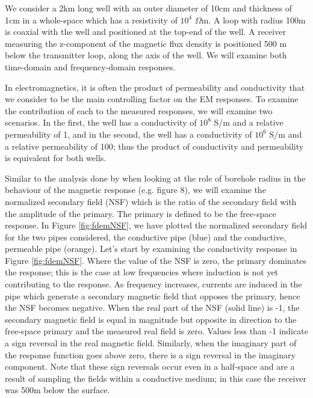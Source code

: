 We consider a 2km long well with an outer diameter of 10cm and thickness of 1cm in a whole-space which has a resistivity of $10^4$ $\Omega$m. A loop with radius 100m is coaxial with the well and positioned at the top-end of the well. A receiver measuring the z-component of the magnetic flux density is positioned 500 m below the transmitter loop, along the axis of the well. We will examine both time-domain and frequency-domain responses.

In electromagnetics, it is often the product of permeability and conductivity that we consider to be the main controlling factor on the EM responses. To examine the contribution of each to the measured responses, we will examine two scenarios. In the first, the well has a conductivity of $10^8$ S/m and a relative permeability of 1, and in the second, the well has a conductivity of $10^6$ S/m and a relative permeability of 100; thus the product of conductivity and permeability is equivalent for both wells.

Similar to the analysis done by \cite{Augustin1989} when looking at the role of borehole radius in the behaviour of the magnetic response (e.g. figure 8), we will examine the normalized secondary field (NSF) which is the ratio of the secondary field with the amplitude of the primary. The primary is defined to be the free-space response. In Figure \ref{fig:fdemNSF}, we have plotted the normalized secondary field for the two pipes considered, the conductive pipe (blue) and the conductive, permeable pipe (orange). Let's start by examining the conductivity response in Figure \ref{fig:fdemNSF}. Where the value of the NSF is zero, the primary dominates the response; this is the case at low frequencies where induction is not yet contributing to the response. As frequency increases, currents are induced in the pipe which generate a secondary magnetic field that opposes the primary, hence the NSF becomes negative. When the real part of the NSF (solid line) is -1, the secondary magnetic field is equal in magnitude but opposite in direction to the free-space primary and the measured real field is zero. Values less than -1 indicate a sign reversal in the real magnetic field. Similarly, when the imaginary part of the response function goes above zero, there is a sign reversal in the imaginary component. Note that these sign reversals occur even in a half-space and are a result of sampling the fields within a conductive medium; in this case the receiver was 500m below the surface.

